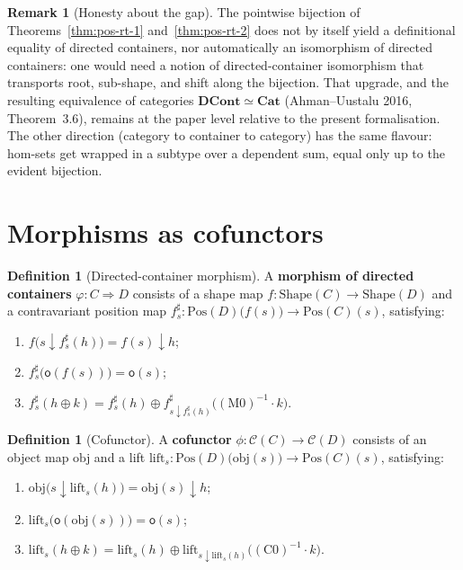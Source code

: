 \documentclass[11pt,a4paper]{article}
\theoremstyle{plain}
\theoremstyle{definition}
\newtheorem{definition}[theorem]{Definition}
\newtheorem{remark}[theorem]{Remark}
\newcommand{\Shape}{\mathrm{Shape}}
\newcommand{\Pos}{\mathrm{Pos}}
\newcommand{\rootpos}{\mathsf{o}}
\newcommand{\sub}{\mathbin{\downarrow}}
\newcommand{\shift}{\oplus}
\newcommand{\cat}{\mathcal{C}}
\newcommand{\DCont}{\mathbf{DCont}}
\newcommand{\Cat}{\mathbf{Cat}}
\begin{document}
\begin{remark}[Honesty about the gap]
The pointwise bijection of Theorems~\ref{thm:pos-rt-1}
and~\ref{thm:pos-rt-2} does not by itself yield a definitional equality of
directed containers, nor automatically an isomorphism of directed containers:
one would need a notion of directed-container isomorphism that transports
root, sub-shape, and shift along the bijection. That upgrade, and the
resulting equivalence of categories $\DCont\simeq\Cat$ (Ahman--Uustalu 2016,
Theorem~3.6), remains at the paper level relative to the present formalisation.
The other direction (category to container to category) has the same flavour:
hom-sets get wrapped in a subtype over a dependent sum, equal only up to the
evident bijection.
\end{remark}

\section{Morphisms as cofunctors}

\begin{definition}[Directed-container morphism]\label{def:dcont-morph}
A \textbf{morphism of directed containers} $\varphi:C\Rightarrow D$ consists
of a shape map $f:\Shape(C)\to\Shape(D)$ and a contravariant position map
$f^\sharp_s:\Pos(D)\bigl(f(s)\bigr)\to\Pos(C)(s)$, satisfying:
\begin{enumerate}
  \item[\textbf{M0.}]
        $f\bigl(s\sub f^\sharp_s(h)\bigr)=f(s)\sub h$;
  \item[\textbf{M1.}]
        $f^\sharp_s\bigl(\rootpos(f(s))\bigr)=\rootpos(s)$;
  \item[\textbf{M2.}]
        $f^\sharp_s(h\shift k)
        = f^\sharp_s(h)\shift
          f^\sharp_{s\sub f^\sharp_s(h)}
            \bigl((\mathrm{M0})^{-1}\cdot k\bigr)$.
\end{enumerate}
\end{definition}

\begin{definition}[Cofunctor]\label{def:cofunctor}
A \textbf{cofunctor} $\phi:\cat(C)\to\cat(D)$ consists of an object map
$\mathrm{obj}$ and a lift
$\mathrm{lift}_s:\Pos(D)\bigl(\mathrm{obj}(s)\bigr)\to\Pos(C)(s)$,
satisfying:
\begin{enumerate}
  \item[\textbf{C0.}]
        $\mathrm{obj}\bigl(s\sub\mathrm{lift}_s(h)\bigr)
        =\mathrm{obj}(s)\sub h$;
  \item[\textbf{C1.}]
        $\mathrm{lift}_s\bigl(\rootpos(\mathrm{obj}(s))\bigr)
        =\rootpos(s)$;
  \item[\textbf{C2.}]
        $\mathrm{lift}_s(h\shift k)
        =\mathrm{lift}_s(h)\shift
          \mathrm{lift}_{s\sub\mathrm{lift}_s(h)}
            \bigl((\mathrm{C0})^{-1}\cdot k\bigr)$.
\end{enumerate}
\end{definition}
\end{document}
